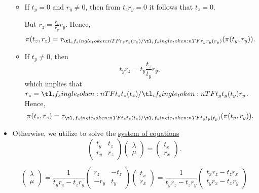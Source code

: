 \begin{defproof}
\begin{itemize}
\begin{itemize}
      \item If \( t_y = 0 \) and \( r_y \neq 0 \), then from \( t_z r_y = 0 \) it follows that \( t_z = 0 \).

      But \( r_z = \frac {r_z} {r_y} r_y \). Hence,
      \begin{equation*}
        \pi(t_z, r_z) = \tau_{\ifrac {r_z} {r_y}}(\pi(t_y, r_y)).
      \end{equation*}

      \item If \( t_y \neq 0 \), then
      \begin{equation*}
        t_y r_z = t_y \frac {t_z} {t_y} r_y,
      \end{equation*}
      which implies that \( r_z = \ifrac {t_z} {t_y} r_y \). Hence,
      \begin{equation*}
        \pi(t_z, r_z) = \tau_{\ifrac {t_z} {t_y}}(\pi(t_y, r_y)).
      \end{equation*}
    \end{itemize}

    \item Otherwise, we utilize  to solve the \hyperref[rem:system_of_equations]{system of equations}
    \begin{equation*}
      \begin{pmatrix}
        t_y & t_z \\
        r_y & r_z
      \end{pmatrix}
      \begin{pmatrix}
        \lambda \\
        \mu
      \end{pmatrix}
      =
      \begin{pmatrix}
        t_x \\ r_x
      \end{pmatrix}.
    \end{equation*}

    \begin{equation*}
      \begin{pmatrix}
        \lambda \\
        \mu
      \end{pmatrix}
      =
      \frac 1 {t_y r_z - t_z r_y}
      \begin{pmatrix}
        r_z  & -t_z \\
        -r_y & t_y
      \end{pmatrix}
      \begin{pmatrix}
        t_x \\ r_x
      \end{pmatrix}
      =
      \frac 1 {t_y r_z - t_z r_y}
      \begin{pmatrix}
        t_x r_z - t_z r_x \\
        t_y r_x - t_x r_y
      \end{pmatrix}
    \end{equation*}


\end{itemize}
\end{defproof}
